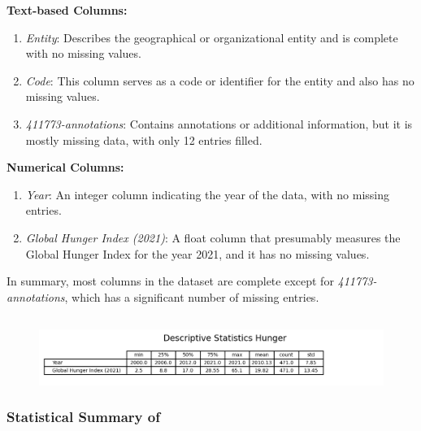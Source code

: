             \textbf{Text-based Columns:}
            \begin{enumerate}
                \item \textit{Entity}: Describes the geographical or organizational entity and is complete with no missing values.
                \item \textit{Code}: This column serves as a code or identifier for the entity and also has no missing values.
                \item \textit{411773-annotations}: Contains annotations or additional information, but it is mostly missing data, with only 12 entries filled.
            \end{enumerate}

            \textbf{Numerical Columns:}
            \begin{enumerate}
                \item \textit{Year}: An integer column indicating the year of the data, with no missing entries.
                \item \textit{Global Hunger Index (2021)}: A float column that presumably measures the Global Hunger Index for the year 2021, and it has no missing values.
            \end{enumerate}

            In summary, most columns in the dataset are complete except for \textit{411773-annotations}, which has a significant number of missing entries.

        \subsection{\duExploreTheData}
            \begin{figure}[H]
                \centering
                \includegraphics[scale=1]{images/du_hunger_summary}
                \caption{}
                \label{fig:du-hunger-summary}
            \end{figure}

            \subsubsection{Statistical Summary of \dsHunger}

